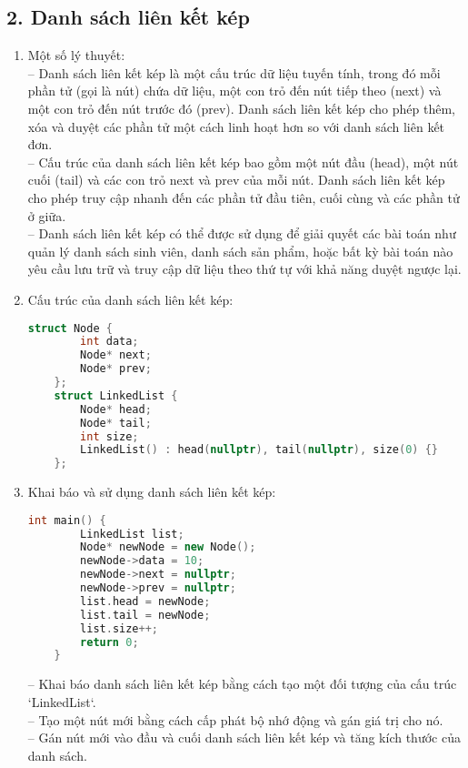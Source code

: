 \subsection*{2. Danh sách liên kết kép}
\begin{enumerate}[label=\alph*.]
    \item Một số lý thuyết:\\
    -- Danh sách liên kết kép là một cấu trúc dữ liệu tuyến tính, trong đó mỗi phần tử (gọi là nút) chứa dữ liệu, một con trỏ đến nút tiếp theo (next) và một con trỏ đến nút trước đó (prev). Danh sách liên kết kép cho phép thêm, xóa và duyệt các phần tử một cách linh hoạt hơn so với danh sách liên kết đơn.\\
    -- Cấu trúc của danh sách liên kết kép bao gồm một nút đầu (head), một nút cuối (tail) và các con trỏ next và prev của mỗi nút. Danh sách liên kết kép cho phép truy cập nhanh đến các phần tử đầu tiên, cuối cùng và các phần tử ở giữa.\\
    -- Danh sách liên kết kép có thể được sử dụng để giải quyết các bài toán như quản lý danh sách sinh viên, danh sách sản phẩm, hoặc bất kỳ bài toán nào yêu cầu lưu trữ và truy cập dữ liệu theo thứ tự với khả năng duyệt ngược lại.
  \item Cấu trúc của danh sách liên kết kép:
  \begin{lstlisting}[language=C++]
    struct Node {
        int data; 
        Node* next; 
        Node* prev; 
    };
    struct LinkedList {
        Node* head; 
        Node* tail; 
        int size;
        LinkedList() : head(nullptr), tail(nullptr), size(0) {} 
    };
  \end{lstlisting}
  \vspace{-4.em}
  \item Khai báo và sử dụng danh sách liên kết kép:
  \begin{lstlisting}[language=C++]
    int main() {
        LinkedList list;
        Node* newNode = new Node(); 
        newNode->data = 10; 
        newNode->next = nullptr; 
        newNode->prev = nullptr; 
        list.head = newNode; 
        list.tail = newNode;
        list.size++;
        return 0;
    }
  \end{lstlisting}
    \vspace{-4.em}
  -- Khai báo danh sách liên kết kép bằng cách tạo một đối tượng của cấu trúc `LinkedList`.\\
  -- Tạo một nút mới bằng cách cấp phát bộ nhớ động và gán giá trị cho nó.\\
  -- Gán nút mới vào đầu và cuối danh sách liên kết kép và tăng kích thước của danh sách.

\end{enumerate}
